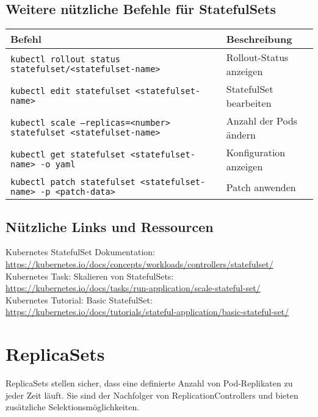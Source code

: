 \subsection{Weitere nützliche Befehle für StatefulSets}
\begin{tabular}{|p{}|p{}|}
\hline
\textbf{Befehl} & \textbf{Beschreibung} \\
\hline
\texttt{kubectl rollout status statefulset/<statefulset-name>} & Rollout-Status anzeigen \\
\texttt{kubectl edit statefulset <statefulset-name>} & StatefulSet bearbeiten \\
\texttt{kubectl scale --replicas=<number> statefulset <statefulset-name>} & Anzahl der Pods ändern \\
\texttt{kubectl get statefulset <statefulset-name> -o yaml} & Konfiguration anzeigen \\
\texttt{kubectl patch statefulset <statefulset-name> -p <patch-data>} & Patch anwenden \\
\hline
\end{tabular}

\subsection{Nützliche Links und Ressourcen}
Kubernetes StatefulSet Dokumentation:\\
\url{https://kubernetes.io/docs/concepts/workloads/controllers/statefulset/}\\
Kubernetes Task: Skalieren von StatefulSets:\\
\url{https://kubernetes.io/docs/tasks/run-application/scale-stateful-set/}\\
Kubernetes Tutorial: Basic StatefulSet:\\
\url{https://kubernetes.io/docs/tutorials/stateful-application/basic-stateful-set/}\\



\section{ReplicaSets}
ReplicaSets stellen sicher, dass eine definierte Anzahl von Pod-Replikaten zu jeder Zeit läuft. Sie sind der Nachfolger von ReplicationControllers und bieten zusätzliche Selektionsmöglichkeiten. \\

